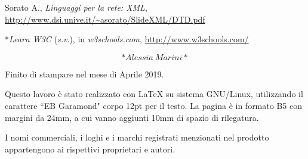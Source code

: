 \documentclass[
  b5paper,
  twoside,
  12pt,
  chapterprefix=false,
  bibliography=totocnumbered,
  parskip=false]{scrbook}
\begin{document}
Sorato A., \emph{Linguaggi per la rete: XML},
\url{http://www.dsi.unive.it/~asorato/SlideXML/DTD.pdf}

*\emph{Learn W3C} (\emph{s.v}.), in \emph{w3schools.com},
\url{http://www.w3schools.com/}

\[*Alessia~Marini*\]

\newpage
\thispagestyle{empty}

\vspace*{\fill}
\centering{\Large{*}}

\centering{\Large{*~~~*}}

\centering{\Large{*}}

\vfill
\pagebreak

\thispagestyle{empty}

\vspace*{\fill}

Finito di stampare nel mese di Aprile 2019.

\vspace{2em}

Questo lavoro è stato realizzato con LaTeX su sistema GNU/Linux, utilizzando il carattere ``EB Garamond" corpo 12pt per il testo. La pagina è in formato B5 con margini da 24mm, a cui vanno aggiunti 10mm di spazio di rilegatura.

\vspace{2em}

I nomi commerciali, i loghi e i marchi registrati menzionati nel prodotto appartengono ai rispettivi proprietari e autori.

\backmatter
\end{document}
